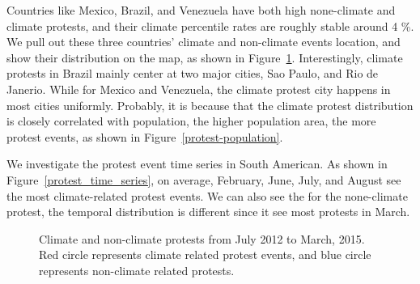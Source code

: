 \documentclass[9pt,twocolumn,twoside]{pnas-new}
\begin{document}
Countries like Mexico, Brazil, and Venezuela have both high none-climate and climate protests, and their climate percentile rates are roughly stable around 4 \%.
We pull out these three countries' climate and non-climate events location, and show their distribution on the map, as shown in Figure~\ref{climate-map}. Interestingly, climate protests in Brazil mainly center at two major cities, Sao Paulo, and Rio de Janerio. While for Mexico and Venezuela, the climate protest city happens in most cities uniformly. Probably, it is because that the climate protest distribution is closely correlated with population, the higher population area, the more protest events, as shown in Figure~\ref{protest-population}. 


We investigate the protest event time series in South American. As shown in Figure~\ref{protest_time_series}, on average, February, June, July, and August see the most climate-related protest events. We can also see the for the none-climate protest, the temporal distribution is different since it see most protests in March. 

\begin{figure}[ht]
	\centering
	\caption{Climate and non-climate protests from July 2012 to March, 2015. Red circle represents climate related protest events, and blue circle represents non-climate related protests. }
\label{climate-map}
\end{figure}
\end{document}
